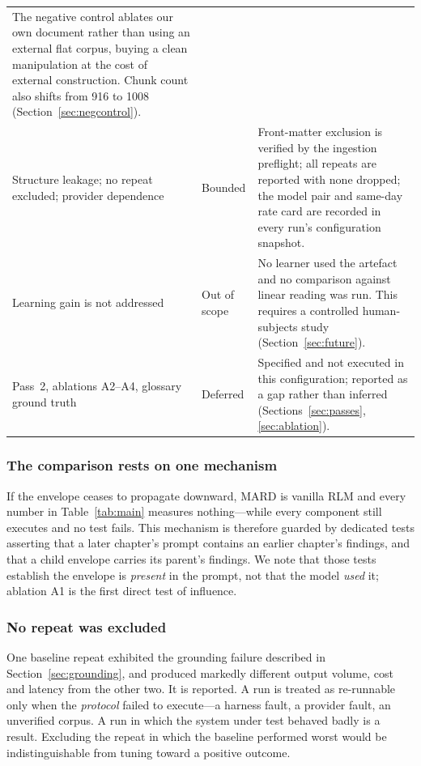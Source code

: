 \documentclass[conference]{IEEEtran}
\begin{document}
\begin{table}[!t]
\begin{tabular}{@{}p{4.3cm}p{2.05cm}p{9.4cm}@{}}
The negative control ablates our own document rather than using an external
flat corpus, buying a clean manipulation at the cost of external
construction. Chunk count also shifts from \num{916} to \num{1008}
(Section~\ref{sec:negcontrol}). \\
Structure leakage; no repeat excluded; provider dependence & Bounded &
Front-matter exclusion is verified by the ingestion preflight; all repeats
are reported with none dropped; the model pair and same-day rate card are
recorded in every run's configuration snapshot. \\
\midrule
Learning gain is not addressed & Out of scope &
No learner used the artefact and no comparison against linear reading was
run. This requires a controlled human-subjects study
(Section~\ref{sec:future}). \\
Pass~2, ablations A2--A4, glossary ground truth & Deferred &
Specified and not executed in this configuration; reported as a gap rather
than inferred (Sections~\ref{sec:passes}, \ref{sec:ablation}). \\
\bottomrule
\end{tabular}
\end{table}

\subsubsection{The comparison rests on one mechanism}
If the envelope ceases to propagate downward, MARD is vanilla RLM and every
number in Table~\ref{tab:main} measures nothing---while every component still
executes and no test fails. This mechanism is therefore guarded by dedicated
tests asserting that a later chapter's prompt contains an earlier chapter's
findings, and that a child envelope carries its parent's findings. We note
that those tests establish the envelope is \emph{present} in the prompt, not
that the model \emph{used} it; ablation A1 is the first direct test of
influence.

\subsubsection{No repeat was excluded}
One baseline repeat exhibited the grounding failure described in
Section~\ref{sec:grounding}, and produced markedly different output volume,
cost and latency from the other two. It is reported. A run is treated as
re-runnable only when the \emph{protocol} failed to execute---a harness
fault, a provider fault, an unverified corpus. A run in which the system
under test behaved badly is a result. Excluding the repeat in which the
baseline performed worst would be indistinguishable from tuning toward a
positive outcome.
\end{document}
